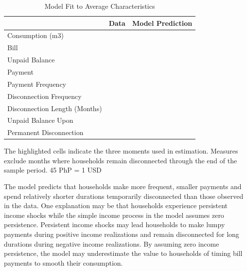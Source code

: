 \documentclass[12pt,table]{article}
\begin{document}
\begin{table}[H]
\centering
\caption{Model Fit to Average Characteristics}\label{table:fit}
\begin{threeparttable}
\begin{tabular}{@{}l*{1}{KK}@{}}
\toprule
 & Data & Model Prediction \\
\midrule
Consumption (m3) &  &   \\
Bill &   &   \\
Unpaid Balance &    &    \\
Payment &   &   \\
Payment Frequency &   &    \\
Disconnection Frequency &    &   \\
Disconnection Length (Months) &  &   \\
Unpaid Balance Upon &   &    \\[-.5em]
Permanent Disconnection \\
\bottomrule
\end{tabular}
\begin{tablenotes}
\item 
\footnotesize
The highlighted cells indicate the three moments used in estimation.  Measures exclude months where households remain disconnected through the end of the sample period.    45 PhP = 1 USD
\end{tablenotes}
\end{threeparttable}

\end{table}


The model predicts that households make more frequent, smaller payments and spend relatively shorter durations temporarily disconnected than those observed in the data.  One explanation may be that households experience persistent income shocks while the simple income process in the model assumes zero persistence.  Persistent income shocks may lead households to make lumpy payments during positive income realizations and remain disconnected for long durations during negative income realizations.  By assuming zero income persistence, the model may underestimate the value to households of timing bill payments to smooth their consumption.  
\end{document}
